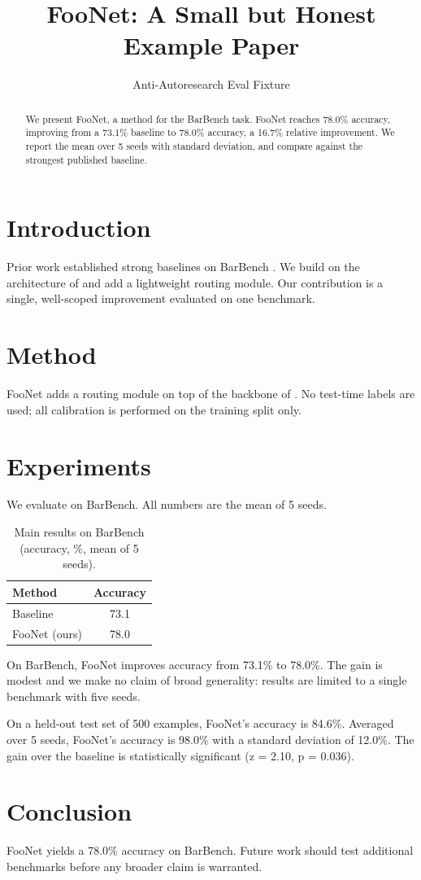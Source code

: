\documentclass{article}
\title{FooNet: A Small but Honest Example Paper}
\author{Anti-Autoresearch Eval Fixture}
\begin{document}
\maketitle

\begin{abstract}
We present FooNet, a method for the BarBench task. FooNet reaches
78.0\% accuracy, improving from a 73.1\% baseline to 78.0\% accuracy,
a 16.7\% relative improvement. We report the mean over 5 seeds with
standard deviation, and compare against the strongest published baseline.
\end{abstract}

\section{Introduction}
Prior work established strong baselines on BarBench \cite{smith2024bar}.
We build on the architecture of \cite{lee2023foundations} and add a
lightweight routing module. Our contribution is a single, well-scoped
improvement evaluated on one benchmark.

\section{Method}
FooNet adds a routing module on top of the backbone of
\cite{lee2023foundations}. No test-time labels are used; all calibration
is performed on the training split only.

\section{Experiments}
We evaluate on BarBench. All numbers are the mean of 5 seeds.

\begin{table}[t]
\caption{Main results on BarBench (accuracy, \%, mean of 5 seeds).}
\begin{tabular}{lc}
\toprule
Method & Accuracy \\
\midrule
Baseline \cite{smith2024bar} & 73.1 \\
FooNet (ours) & 78.0 \\
\bottomrule
\end{tabular}
\end{table}

On BarBench, FooNet improves accuracy from 73.1\% to 78.0\%. The gain is
modest and we make no claim of broad generality: results are limited to a
single benchmark with five seeds.

On a held-out test set of 500 examples, FooNet's accuracy is 84.6\%.
Averaged over 5 seeds, FooNet's accuracy is 98.0\% with a standard
deviation of 12.0\%. The gain over the baseline is statistically
significant (z = 2.10, p = 0.036).

\section{Conclusion}
FooNet yields a 78.0\% accuracy on BarBench. Future work should test
additional benchmarks before any broader claim is warranted.
\end{document}
